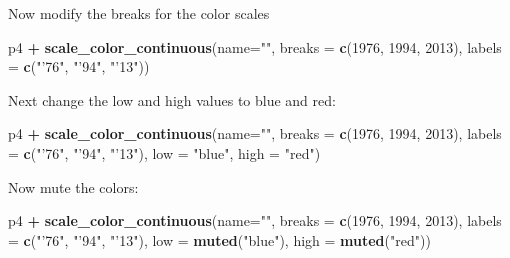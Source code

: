 \documentclass[]{book}
\newenvironment{Shaded}{\begin{snugshade}}{\end{snugshade}}
\newcommand{\KeywordTok}[1]{\textcolor[rgb]{0.13,0.29,0.53}{\textbf{#1}}}
\newcommand{\DataTypeTok}[1]{\textcolor[rgb]{0.13,0.29,0.53}{#1}}
\newcommand{\DecValTok}[1]{\textcolor[rgb]{0.00,0.00,0.81}{#1}}
\newcommand{\StringTok}[1]{\textcolor[rgb]{0.31,0.60,0.02}{#1}}
\newcommand{\OperatorTok}[1]{\textcolor[rgb]{0.81,0.36,0.00}{\textbf{#1}}}
\newcommand{\NormalTok}[1]{#1}
\begin{document}
Now modify the breaks for the color scales

\begin{Shaded}
\begin{Highlighting}[]
\NormalTok{p4 }\OperatorTok{+}\StringTok{ }
\StringTok{  }\KeywordTok{scale_color_continuous}\NormalTok{(}\DataTypeTok{name=}\StringTok{""}\NormalTok{,}
                         \DataTypeTok{breaks =} \KeywordTok{c}\NormalTok{(}\DecValTok{1976}\NormalTok{, }\DecValTok{1994}\NormalTok{, }\DecValTok{2013}\NormalTok{),}
                         \DataTypeTok{labels =} \KeywordTok{c}\NormalTok{(}\StringTok{"'76"}\NormalTok{, }\StringTok{"'94"}\NormalTok{, }\StringTok{"'13"}\NormalTok{))}
\end{Highlighting}
\end{Shaded}

Next change the low and high values to blue and red:

\begin{Shaded}
\begin{Highlighting}[]
\NormalTok{p4 }\OperatorTok{+}
\StringTok{  }\KeywordTok{scale_color_continuous}\NormalTok{(}\DataTypeTok{name=}\StringTok{""}\NormalTok{,}
                         \DataTypeTok{breaks =} \KeywordTok{c}\NormalTok{(}\DecValTok{1976}\NormalTok{, }\DecValTok{1994}\NormalTok{, }\DecValTok{2013}\NormalTok{),}
                         \DataTypeTok{labels =} \KeywordTok{c}\NormalTok{(}\StringTok{"'76"}\NormalTok{, }\StringTok{"'94"}\NormalTok{, }\StringTok{"'13"}\NormalTok{),}
                         \DataTypeTok{low =} \StringTok{"blue"}\NormalTok{, }\DataTypeTok{high =} \StringTok{"red"}\NormalTok{)}
\end{Highlighting}
\end{Shaded}

Now mute the colors:

\begin{Shaded}
\begin{Highlighting}[]
\NormalTok{p4 }\OperatorTok{+}
\StringTok{  }\KeywordTok{scale_color_continuous}\NormalTok{(}\DataTypeTok{name=}\StringTok{""}\NormalTok{,}
                         \DataTypeTok{breaks =} \KeywordTok{c}\NormalTok{(}\DecValTok{1976}\NormalTok{, }\DecValTok{1994}\NormalTok{, }\DecValTok{2013}\NormalTok{),}
                         \DataTypeTok{labels =} \KeywordTok{c}\NormalTok{(}\StringTok{"'76"}\NormalTok{, }\StringTok{"'94"}\NormalTok{, }\StringTok{"'13"}\NormalTok{),}
                         \DataTypeTok{low =} \KeywordTok{muted}\NormalTok{(}\StringTok{"blue"}\NormalTok{), }\DataTypeTok{high =} \KeywordTok{muted}\NormalTok{(}\StringTok{"red"}\NormalTok{))}
\end{Highlighting}
\end{Shaded}
\end{document}
